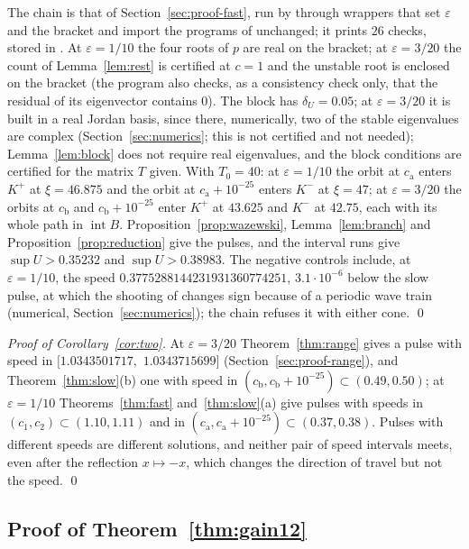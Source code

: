 \documentclass[11pt]{article}
\theoremstyle{definition}
\newcommand{\eps}{\varepsilon}
\begin{document}
The chain is that of Section~\ref{sec:proof-fast}, run by  through wrappers that set $\eps$ and the bracket and import the programs of  unchanged; it prints $26$ checks, stored in . At $\eps = 1/10$ the four roots of $p$ are real on the bracket; at $\eps = 3/20$ the count of Lemma~\ref{lem:rest} is certified at $c = 1$ and the unstable root is enclosed on the bracket (the program also checks, as a consistency check only, that the residual of its eigenvector contains $0$). The block has $\delta_U = 0.05$; at $\eps = 3/20$ it is built in a real Jordan basis, since there, numerically, two of the stable eigenvalues are complex (Section~\ref{sec:numerics}; this is not certified and not needed); Lemma~\ref{lem:block} does not require real eigenvalues, and the block conditions are certified for the matrix $T$ given. With $T_0 = 40$: at $\eps = 1/10$ the orbit at $c_{\mathrm a}$ enters $K^+$ at $\xi = 46.875$ and the orbit at $c_{\mathrm a} + 10^{-25}$ enters $K^-$ at $\xi = 47$; at $\eps = 3/20$ the orbits at $c_{\mathrm b}$ and $c_{\mathrm b} + 10^{-25}$ enter $K^+$ at $43.625$ and $K^-$ at $42.75$, each with its whole path in $\operatorname{int} B$. Proposition~\ref{prop:wazewski}, Lemma~\ref{lem:branch} and Proposition~\ref{prop:reduction} give the pulses, and the interval runs give $\sup U > 0.35232$ and $\sup U > 0.38983$. The negative controls include, at $\eps = 1/10$, the speed $0.3775288144231931360774251$, $3.1\cdot 10^{-6}$ below the slow pulse, at which the shooting of  changes sign because of a periodic wave train (numerical, Section~\ref{sec:numerics}); the chain refuses it with either cone. \qed

\emph{Proof of Corollary~\ref{cor:two}.} At $\eps = 3/20$ Theorem~\ref{thm:range} gives a pulse with speed in $[1.0343501717,$ $1.0343715699]$ (Section~\ref{sec:proof-range}), and Theorem~\ref{thm:slow}(b) one with speed in $(c_{\mathrm b}, c_{\mathrm b} + 10^{-25}) \subset (0.49, 0.50)$; at $\eps = 1/10$ Theorems~\ref{thm:fast} and~\ref{thm:slow}(a) give pulses with speeds in $(c_1, c_2) \subset (1.10, 1.11)$ and in $(c_{\mathrm a}, c_{\mathrm a} + 10^{-25}) \subset (0.37, 0.38)$. Pulses with different speeds are different solutions, and neither pair of speed intervals meets, even after the reflection $x \mapsto -x$, which changes the direction of travel but not the speed. \qed

\subsection{Proof of Theorem~\ref{thm:gain12}}\label{sec:proof-gain12}
\end{document}
